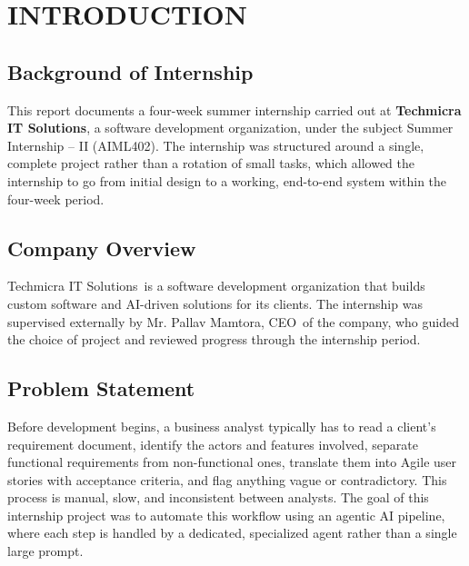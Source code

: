 \documentclass[12pt,a4paper,openany]{report}
\newcommand{\externalguide}{Mr. Pallav Mamtora}
\newcommand{\externaltitle}{CEO}
\newcommand{\company}{Techmicra IT Solutions}
\begin{document}
\pagestyle{fancy}
\setcounter{page}{6}
\tableofcontents
\clearpage
\listoffigures
\clearpage

\pagestyle{fancy}

\chapter{INTRODUCTION}

\section{Background of Internship}
This report documents a four-week summer internship carried out at
\textbf{\company}, a software development organization, under the
subject Summer Internship -- II (AIML402). The internship was structured
around a single, complete project rather than a rotation of small tasks,
which allowed the internship to go from initial design to a working,
end-to-end system within the four-week period.

\section{Company Overview}
\company\ is a software development organization that builds custom
software and AI-driven solutions for its clients. The internship was
supervised externally by \externalguide, \externaltitle\ of the company,
who guided the choice of project and reviewed progress through the
internship period.

\section{Problem Statement}
Before development begins, a business analyst typically has to read a
client's requirement document, identify the actors and features involved,
separate functional requirements from non-functional ones, translate them
into Agile user stories with acceptance criteria, and flag anything vague
or contradictory. This process is manual, slow, and inconsistent between
analysts. The goal of this internship project was to automate this
workflow using an agentic AI pipeline, where each step is handled by a
dedicated, specialized agent rather than a single large prompt.
\end{document}
